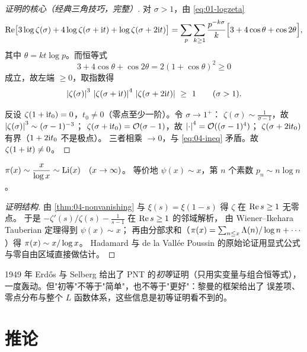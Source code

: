\begin{proof}[证明的核心（经典三角技巧，完整）]
对 $\sigma>1$，由 \cref{eq:01-logzeta}
\[
 \operatorname{Re}\bigl[3\log\zeta(\sigma)+4\log\zeta(\sigma+\mathrm{i} t)+\log\zeta(\sigma+2\mathrm{i} t)\bigr]
 =\sum_p\sum_{k\ge1}\frac{p^{-k\sigma}}{k}
   \Bigl[3+4\cos\theta+\cos2\theta\Bigr],
\]
其中 $\theta=kt\log p$。而恒等式
\begin{equation}\label{eq:04-trig}
  3+4\cos\theta+\cos2\theta=2(1+\cos\theta)^2\ge0
\end{equation}
成立，故左端 $\ge0$，取指数得
\begin{equation}\label{eq:04-ineq}
  \left\lvert \zeta(\sigma)\right\rvert^{3}\,\left\lvert \zeta(\sigma+\mathrm{i} t)\right\rvert^{4}\,
  \left\lvert \zeta(\sigma+2\mathrm{i} t)\right\rvert\ \ge\ 1\qquad(\sigma>1).
\end{equation}

反设 $\zeta(1+\mathrm{i} t_0)=0$，$t_0\ne0$（零点至少一阶）。令 $\sigma\to1^+$：
$\zeta(\sigma)\sim\frac{1}{\sigma-1}$，故 $\left\lvert \zeta(\sigma)\right\rvert^3\sim(\sigma-1)^{-3}$；
$\zeta(\sigma+\mathrm{i} t_0)=\mathcal{O}(\sigma-1)$，故 $\left\lvert \cdot\right\rvert^4=\mathcal{O}((\sigma-1)^4)$；
$\zeta(\sigma+2\mathrm{i} t_0)$ 有界（$1+2\mathrm{i} t_0$ 不是极点）。
三者相乘 $\to0$，与 \cref{eq:04-ineq} 矛盾。故 $\zeta(1+\mathrm{i} t)\ne0$。
\end{proof}

\begin{theorem}\label{thm:04-pnt}
$\displaystyle\pi(x)\sim\frac{x}{\log x}\sim\operatorname{Li}(x)\quad(x\to\infty)$。
等价地 $\psi(x)\sim x$，第 $n$ 个素数 $p_n\sim n\log n$。
\end{theorem}

\begin{proof}[证明结构]
由 \cref{thm:04-nonvanishing} 与 $\xi(s)=\xi(1-s)$ 得 $\zeta$ 在 $\operatorname{Re} s\ge1$ 无零点。
于是 $-\zeta'(s)/\zeta(s)-\frac{1}{s-1}$ 在 $\operatorname{Re} s\ge1$ 的邻域解析，
由 Wiener--Ikehara Tauberian 定理得到 $\psi(x)\sim x$；
再由分部求和（$\pi(x)=\sum_{n\le x}\Lambda(n)/\log n+\cdots$）得 $\pi(x)\sim x/\log x$。
Hadamard 与 de la Vall\'ee Poussin 的原始论证用显式公式与零自由区域直接做估计。
\end{proof}

\begin{histbox}
1949 年 Erd\H os 与 Selberg 给出了 PNT 的\emph{初等}证明（只用实变量与组合恒等式），
一度轰动。但"初等"不等于"简单"，也不等于"更好"：黎曼的框架给出了
误差项、零点分布与整个 $L$ 函数体系，这些信息是初等证明看不到的。
\end{histbox}

\section{推论}
\label{sec:04-corollaries}

